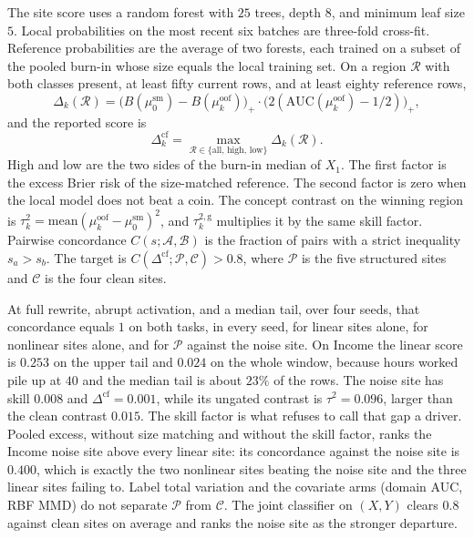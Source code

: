 The site score uses a random forest with \(25\) trees, depth \(8\), and
minimum leaf size \(5\).
Local probabilities on the most recent six batches are three-fold
cross-fit.
Reference probabilities are the average of two forests, each trained on a
subset of the pooled burn-in whose size equals the local training set.
On a region \(\mathcal{R}\) with both classes present, at least fifty
current rows, and at least eighty reference rows,
\begin{equation}
\label{eq:delta-region-fed}
\Delta_k(\mathcal{R})
=
\bigl(B(\mu_0^{\mathrm{sm}})-B(\mu_k^{\mathrm{oof}})\bigr)_+
\cdot
\bigl(2(\mathrm{AUC}(\mu_k^{\mathrm{oof}})-1/2)\bigr)_+,
\end{equation}
and the reported score is
\begin{equation}
\label{eq:delta-cf-fed}
\Delta_k^{\mathrm{cf}}
=
\max_{\mathcal{R}\in\{\mathrm{all},\,\mathrm{high},\,\mathrm{low}\}}
\Delta_k(\mathcal{R}).
\end{equation}
High and low are the two sides of the burn-in median of \(X_1\).
The first factor is the excess Brier risk of the size-matched reference.
The second factor is zero when the local model does not beat a coin.
The concept contrast on the winning region is
\(\tau_k^2=\mathrm{mean}(\mu_k^{\mathrm{oof}}-\mu_0^{\mathrm{sm}})^2\),
and \(\tau_k^{2,\mathrm{g}}\) multiplies it by the same skill factor.
Pairwise concordance \(C(s;\mathcal{A},\mathcal{B})\) is the fraction of
pairs with a strict inequality \(s_a>s_b\).
The target is \(C(\Delta^{\mathrm{cf}};\mathcal{P},\mathcal{C})>0.8\),
where \(\mathcal{P}\) is the five structured sites and \(\mathcal{C}\) is
the four clean sites.

At full rewrite, abrupt activation, and a median tail, over four seeds,
that concordance equals \(1\) on both tasks, in every seed, for linear
sites alone, for nonlinear sites alone, and for \(\mathcal{P}\) against
the noise site.
On Income the linear score is \(0.253\) on the upper tail and \(0.024\) on
the whole window, because hours worked pile up at \(40\) and the median
tail is about \(23\%\) of the rows.
The noise site has skill \(0.008\) and \(\Delta^{\mathrm{cf}}=0.001\),
while its ungated contrast is \(\tau^2=0.096\), larger than the clean
contrast \(0.015\).
The skill factor is what refuses to call that gap a driver.
Pooled excess, without size matching and without the skill factor, ranks
the Income noise site above every linear site: its concordance against
the noise site is \(0.400\), which is exactly the two nonlinear sites
beating the noise site and the three linear sites failing to.
Label total variation and the covariate arms (domain AUC, RBF MMD) do not
separate \(\mathcal{P}\) from \(\mathcal{C}\).
The joint classifier on \((X,Y)\) clears \(0.8\) against clean sites on
average and ranks the noise site as the stronger departure.

